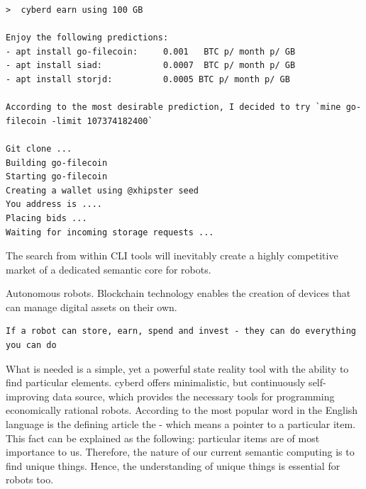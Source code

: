 \documentclass[8pt,oneside]{amsart}
\newcommand{\linkgreen}[2]{\href{#1}{\color{green}{#2}}}
\newcommand{\code}[1]{{\PlayBold #1}}
\begin{document}
\begin{Abstract}
\begin{lstlisting}
>  cyberd earn using 100 GB

Enjoy the following predictions:
- apt install go-filecoin:     0.001   BTC p/ month p/ GB
- apt install siad:            0.0007  BTC p/ month p/ GB
- apt install storjd:          0.0005 BTC p/ month p/ GB

According to the most desirable prediction, I decided to try `mine go-filecoin -limit 107374182400`

Git clone ...
Building go-filecoin
Starting go-filecoin
Creating a wallet using @xhipster seed
You address is ....
Placing bids ...
Waiting for incoming storage requests ...

\end{lstlisting}

The search from within CLI tools will inevitably create a highly competitive market of a dedicated semantic core for robots.

\code{Autonomous robots}. Blockchain technology enables the creation of devices that can manage digital assets on their own.

\begin{lstlisting}
If a robot can store, earn, spend and invest - they can do everything you can do
\end{lstlisting}

What is needed is a simple, yet a powerful state reality tool with the ability to find particular elements. \code{cyberd} offers minimalistic, but continuously self-improving data source, which provides the necessary tools for programming economically rational robots. According to \linkgreen{https://github.com/first20hours/google-10000-english}{top-10,000 English words} the most popular word in the English language is the defining article \code{the} - which means a pointer to a particular item. This fact can be explained as the following: particular items are of most importance to us. Therefore, the nature of our current semantic computing is to find unique things. Hence, the understanding of unique things is essential for robots too.


\end{Abstract}
\end{document}
